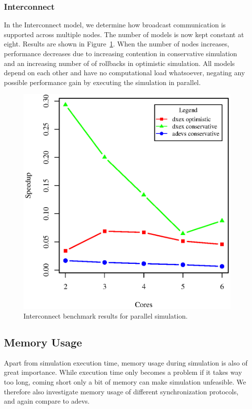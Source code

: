\subsubsection{Interconnect}
In the Interconnect model, we determine how broadcast communication is supported across multiple nodes.
The number of models is now kept constant at eight.
Results are shown in Figure~\ref{fig:interconnect_benchmark_parallel}.
When the number of nodes increases, performance decreases due to increasing contention in conservative simulation and an increasing number of of rollbacks in optimistic simulation.
All models depend on each other and have no computational load whatsoever, negating any possible performance gain by executing the simulation in parallel.

\begin{figure}
    \center
    \includegraphics[width=\plotfraction\columnwidth]{fig/interconnect_parallel.eps}
    \caption{Interconnect benchmark results for parallel simulation.}
    \label{fig:interconnect_benchmark_parallel}
\end{figure}

\subsection{Memory Usage}
Apart from simulation execution time, memory usage during simulation is also of great importance.
While execution time only becomes a problem if it takes way too long, coming short only a bit of memory can make simulation unfeasible.
We therefore also investigate memory usage of different synchronization protocols, and again compare to adevs.

